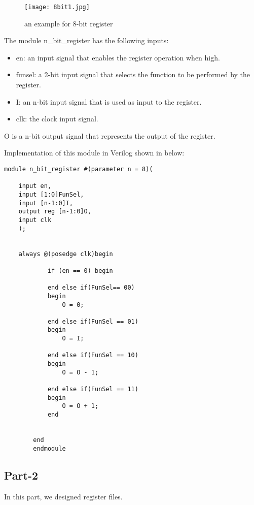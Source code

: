 \documentclass[12pt]{article}
\begin{document}
\begin{figure}[H]
    \centering
    \texttt{[image: 8bit1.jpg]}
    \caption{an example for 8-bit register}
    \label{fig:part1} %
\end{figure}

The module n\_bit\_register has the following inputs:
\begin{itemize}
    \item en: an input signal that enables the register operation when high.
    \item funsel: a 2-bit input signal that selects the function to be performed by the register.
    \item I: an n-bit input signal that is used as input to the register.
    \item clk: the clock input signal.
\end{itemize}

O is a n-bit output signal that represents the output of the register.

\clearpage


Implementation of this module in Verilog shown in below:

\vspace{0.5cm}
\begin{lstlisting}
module n_bit_register #(parameter n = 8)(
    
    input en, 
    input [1:0]FunSel,
    input [n-1:0]I,
    output reg [n-1:0]O,
    input clk
    );
    
    
    always @(posedge clk)begin
            
            if (en == 0) begin
                
            end else if(FunSel== 00)
            begin
                O = 0;
                
            end else if(FunSel == 01)
            begin
                O = I;
               
            end else if(FunSel == 10)
            begin
                O = O - 1;
                
            end else if(FunSel == 11)
            begin
                O = O + 1;
            end
            
            
        end
        endmodule
\end{lstlisting}

\clearpage
        
\subsection{Part-2}
In this part, we designed register files.
\end{document}
